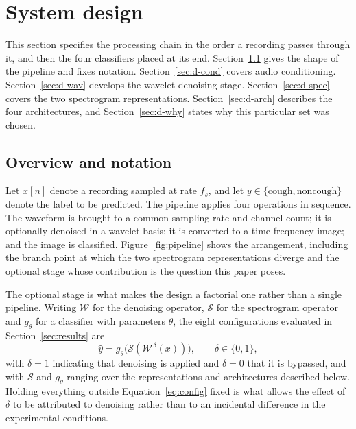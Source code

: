 \section{System design}\label{sec:design}

This section specifies the processing chain in the order a recording passes
through it, and then the four classifiers placed at its end.
Section~\ref{sec:d-overview} gives the shape of the pipeline and fixes
notation. Section~\ref{sec:d-cond} covers audio conditioning.
Section~\ref{sec:d-wav} develops the wavelet denoising stage.
Section~\ref{sec:d-spec} covers the two spectrogram representations.
Section~\ref{sec:d-arch} describes the four architectures, and
Section~\ref{sec:d-why} states why this particular set was chosen.

\subsection{Overview and notation}\label{sec:d-overview}

Let $x[n]$ denote a recording sampled at rate $f_s$, and let
$y \in \{\text{cough}, \text{noncough}\}$ denote the label to be predicted.
The pipeline applies four operations in sequence. The waveform is brought to a
common sampling rate and channel count; it is optionally denoised in a wavelet
basis; it is converted to a time frequency image; and the image is classified.
Figure~\ref{fig:pipeline} shows the arrangement, including the branch point at
which the two spectrogram representations diverge and the optional stage whose
contribution is the question this paper poses.

The optional stage is what makes the design a factorial one rather than a
single pipeline. Writing $\mathcal{W}$ for the denoising operator,
$\mathcal{S}$ for the spectrogram operator and $g_\theta$ for a classifier
with parameters $\theta$, the eight configurations evaluated in
Section~\ref{sec:results} are
\begin{equation}
\hat{y} = g_\theta\big(\mathcal{S}(\mathcal{W}^{\,\delta}(x))\big),
\qquad \delta \in \{0, 1\},
\label{eq:config}
\end{equation}
with $\delta = 1$ indicating that denoising is applied and $\delta = 0$ that
it is bypassed, and with $\mathcal{S}$ and $g_\theta$ ranging over the
representations and architectures described below. Holding everything outside
Equation~\eqref{eq:config} fixed is what allows the effect of $\delta$ to be
attributed to denoising rather than to an incidental difference in the
experimental conditions.

